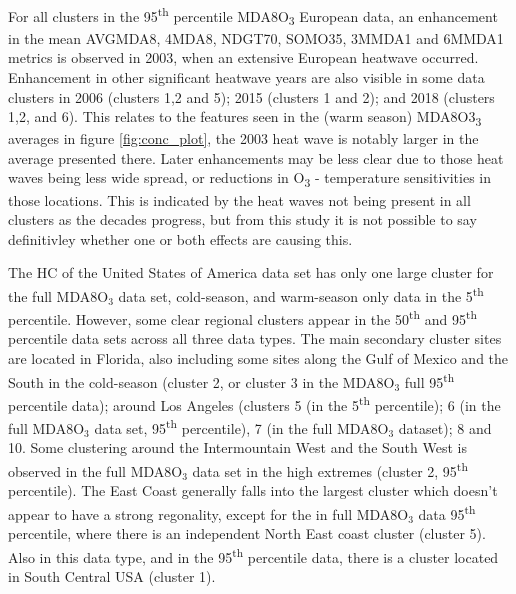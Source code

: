 \documentclass[journal abbreviation, manuscript]{copernicus}
\begin{document}
For all clusters in the 95\textsuperscript{th} percentile MDA8O\textsubscript{3} European data, an enhancement in the mean AVGMDA8, 4MDA8, NDGT70, SOMO35, 3MMDA1 and 6MMDA1 metrics is observed in 2003, when an extensive European heatwave occurred. Enhancement in other significant heatwave years are also visible in some data clusters in 2006 (clusters 1,2 and 5); 2015 (clusters 1 and 2); and 2018 (clusters 1,2, and 6). This relates to the features seen in the (warm season) MDA8O3\textsubscript{3} averages in figure \ref{fig:conc_plot}, the 2003 heat wave is notably larger in the average presented there. Later enhancements may be less clear due to those heat waves being less wide spread, or reductions in O\textsubscript{3} - temperature sensitivities in those locations. This is indicated by the heat waves not being present in all clusters as the decades progress, but from this study it is not possible to say definitivley whether one or both effects are causing this.

The HC of the United States of America data set has only one large cluster for the full MDA8O$_3$ data set, cold-season, and warm-season only data in the 5\textsuperscript{th} percentile. However, some clear regional clusters appear in the 50\textsuperscript{th} and 95\textsuperscript{th} percentile data sets across all three data types. The main secondary cluster sites are located in Florida, also including some sites along the Gulf of Mexico and the South in the cold-season (cluster 2, or cluster 3 in the MDA8O$_3$ full 95\textsuperscript{th} percentile data); around Los Angeles (clusters 5 (in the 5\textsuperscript{th} percentile); 6 (in the full MDA8O$_3$ data set, 95\textsuperscript{th} percentile), 7 (in the full MDA8O$_3$ dataset); 8 and 10. Some clustering around the Intermountain West and the South West is observed in the full MDA8O$_3$ data set in the high extremes (cluster 2, 95\textsuperscript{th} percentile). The East Coast generally falls into the largest cluster which doesn't appear to have a strong regonality, except for the in full MDA8O$_3$ data 95\textsuperscript{th} percentile, where there is an independent North East coast cluster (cluster 5). Also in this data type, and in the 95\textsuperscript{th} percentile data, there is a cluster located in South Central USA (cluster 1).
\end{document}
